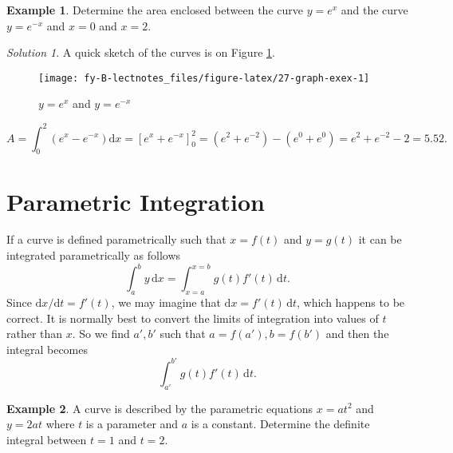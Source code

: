 \documentclass[
  11pt,
  oneside]{book}
\newcommand{\slide}{}
\theoremstyle{definition}
\theoremstyle{definition}
\newtheorem{example}{Example}[chapter]
\theoremstyle{definition}
\theoremstyle{definition}
\theoremstyle{remark}
\newtheorem*{solution}{Solution}
\begin{document}
\begin{example}
Determine the area enclosed between the curve \(y=e^x\) and the curve \(y=e^{-x}\) and \(x=0\) and \(x=2\).
\end{example}

\begin{solution}
\leavevmode

A quick sketch of the curves is on Figure \ref{fig:27-graph-exex}.

\begin{figure}

{\centering \texttt{[image: fy-B-lectnotes\_files/figure-latex/27-graph-exex-1]} 

}

\caption{$y=e^x$ and $y=e^{-x}$}\label{fig:27-graph-exex}
\end{figure}

\[
A = \int_0^2(e^x-e^{-x})\mathrm{d}x = \left[e^x+e^{-x}\right]_0^2 = (e^2+e^{-2})-(e^0+e^0) = e^2+e^{-2}-2=5.52.
\]

\end{solution}

\slide

\begin{slidesonly}

\hbox{}
\slide

\end{slidesonly}

\section{Parametric Integration}\label{parametric-integration}

If a curve is defined parametrically such that \(x = f(t)\) and \(y = g(t)\) it can be integrated parametrically as follows
\[
\int_a^b y\,\mathrm{d}x = \int_{x=a}^{x=b}g(t)f'(t)\,\mathrm{d}t.
\]
Since \(\mathrm{d}x/\mathrm{d}t = f'(t)\), we may imagine that \(\mathrm{d}x = f'(t)\,\mathrm{d}t\), which happens to be correct. It is normally best to convert the limits of integration into values of \(t\) rather than \(x\). So we find \(a', b'\) such that \(a=f(a'), b = f(b')\) and then the integral becomes
\[
\int_{a'}^{b'}g(t)f'(t)\,\mathrm{d}t.
\]
\slide

\begin{example}
A curve is described by the parametric equations \(x = at^2\) and \(y = 2at\) where \(t\) is a parameter and \(a\) is a constant. Determine the definite integral between \(t = 1\) and \(t = 2\).
\end{example}
\end{document}
